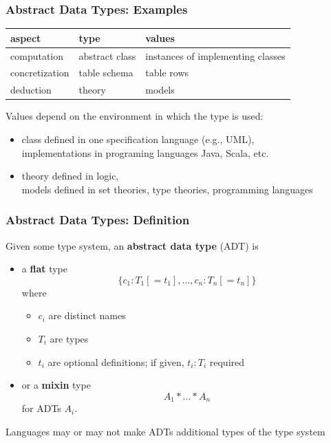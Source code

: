 \begin{frame}\frametitle{Abstract Data Types: Examples}
\begin{center}
\begin{tabular}{l|ll}
aspect & type & values \\
\hline
computation & abstract class & instances of implementing classes \\
concretization & table schema & table rows \\
deduction & theory & models
\end{tabular}
\end{center}

Values depend on the environment in which the type is used:
\begin{itemize}
\item class defined in one specification language (e.g., UML), \\
 implementations in programing languages Java, Scala, etc.
\item theory defined in logic,\\
 models defined in set theories, type theories, programming languages
\end{itemize}
\end{frame}

\begin{frame}\frametitle{Abstract Data Types: Definition}
Given some type system, an \textbf{abstract data type} (ADT) is
\begin{itemize}
\item a \textbf{flat} type
  \[\{c_1:T_1[=t_1],\ldots,c_n:T_n[=t_n]\}\]
  where
  \begin{itemize}
  \item $c_i$ are distinct names
  \item $T_i$ are types
  \item $t_i$ are optional definitions; if given, $t_i:T_i$ required
  \end{itemize}
\item or a \textbf{mixin} type
  \[A_1*\ldots*A_n\]
  for ADTs $A_i$.
\end{itemize}

Languages may or may not make ADTs additional types of the type system
\end{frame}

